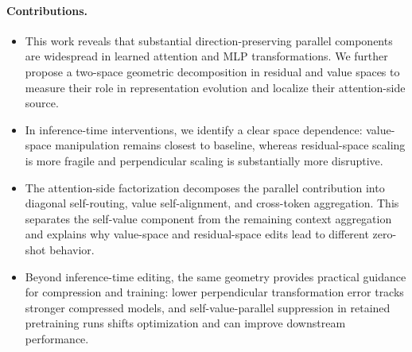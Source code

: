 \paragraph{Contributions.}
\begin{itemize}
  \item This work reveals that substantial direction-preserving parallel
        components are widespread in learned attention and MLP transformations.
        We further propose a two-space geometric decomposition in residual and
        value spaces to measure their role in representation evolution and
        localize their attention-side source.
  \item In inference-time interventions, we identify a clear space dependence:
        value-space manipulation remains closest to baseline, whereas
        residual-space scaling is more fragile and perpendicular scaling is
        substantially more disruptive.
  \item The attention-side factorization decomposes the parallel contribution
        into diagonal self-routing, value self-alignment, and cross-token
        aggregation. This separates the self-value component from the
        remaining context aggregation and explains why value-space and
        residual-space edits lead to different zero-shot behavior.
  \item Beyond inference-time editing, the same geometry provides practical
        guidance for compression and training: lower perpendicular
        transformation error tracks stronger compressed models, and
        self-value-parallel suppression in retained pretraining runs shifts
        optimization and can improve downstream performance.
\end{itemize}
